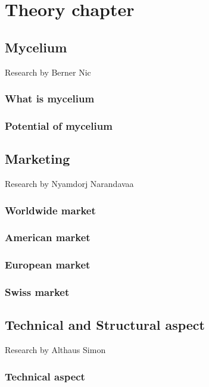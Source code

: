 \documentclass{article}
\begin{document}
\tableofcontents
\thispagestyle{empty}

\newpage
\section{Theory chapter}
\subsection{Mycelium}
{\small Research by Berner Nic}

\subsubsection{What is mycelium}


\subsubsection{Potential of mycelium}

\subsection{Marketing}
{\small Research by Nyamdorj Narandavaa}

\subsubsection{Worldwide market}

\subsubsection{American market}

\subsubsection{European market}

\subsubsection{Swiss market}

\subsection{Technical and Structural aspect}
{\small Research by Althaus Simon}

\subsubsection{Technical aspect}
\end{document}
